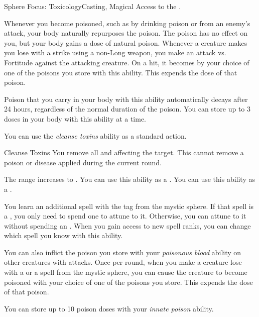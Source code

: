     \begin{feat}{Sphere Focus: Toxicology}{Casting, Magical}
        \featpre Access to the  .

         Whenever you become poisoned, such as by drinking poison or from an enemy's attack, your body naturally repurposes the poison.
        The poison has no effect on you, but your body gains a dose of natural poison.
        Whenever a creature makes you lose  with a  strike using a non-Long weapon, you make an attack vs. Fortitude against the attacking creature.
        On a hit, it becomes  by your choice of one of the poisons you store with this ability.
        This expends the dose of that poison.

        Poison that you carry in your body with this ability automatically decays after 24 hours, regardless of the normal duration of the poison.
        You can store up to 3 doses in your body with this ability at a time.

         You can use the \textit{cleanse toxins} ability as a standard action.
        \begin{activeability}{Cleanse Toxins}
            \label{Cleanse Toxins}
            You remove all  and  affecting the target.
            This cannot remove a poison or disease applied during the current round.

            \rankline
             The range increases to \rngmed.
             You can use this ability as a .
             You can use this ability as a .
        \end{activeability}

         You learn an additional spell with the  tag from the  mystic sphere.
        If that spell is a , you only need to spend one  to attune to it.
        Otherwise, you can attune to it without spending an .
        When you gain access to new spell ranks, you can change which spell you know with this ability.

         You can also inflict the poison you store with your \textit{poisonous blood} ability on other creatures with attacks.
        Once per round, when you make a creature lose  with a  or a spell from the  mystic sphere, you can cause the creature to become poisoned with your choice of one of the poisons you store.
        This expends the dose of that poison.

         You can store up to 10 poison doses with your \textit{innate poison} ability.
    \end{feat}


